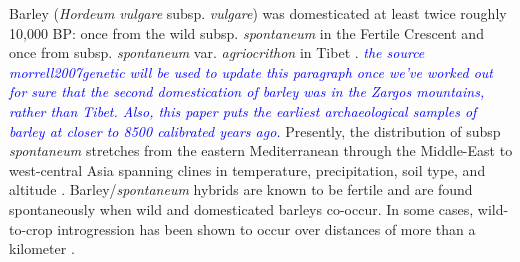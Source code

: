 \documentclass[11pt]{article}
\newcommand{\gmj}[1]{\textcolor{blue}{ \emph{\scriptsize  #1}} } %
\begin{document}
\begin{enumerate}
Barley (\emph{Hordeum vulgare} subsp. \emph{vulgare}) was domesticated at least twice roughly 10,000 BP: once from the wild subsp. \emph{spontaneum} in the Fertile Crescent and once from subsp. \emph{spontaneum} var. \emph{agriocrithon} in Tibet \cite{takahashi1955origin, badr2000origin, oka2012origin, azhaguvel2007phylogenetic, haberer2015barley}.
\gmj{the source morrell2007genetic will be used to update this paragraph once we've worked out for sure that the second domestication of barley was in the Zargos mountains, rather than Tibet.  Also, this paper puts the earliest archaeological samples of barley at closer to 8500 calibrated years ago.}
Presently, the distribution of subsp \emph{spontaneum} stretches from the eastern Mediterranean through the Middle-East to west-central Asia spanning clines in temperature, precipitation, soil type, and altitude \cite{nevo2010drought}.
Barley/\emph{spontaneum} hybrids are known to be fertile and are found spontaneously when wild and domesticated barleys co-occur.
In some cases, wild-to-crop introgression has been shown to occur over distances of more than a kilometer \cite{hillman2001new}.



\end{enumerate}
\end{document}
